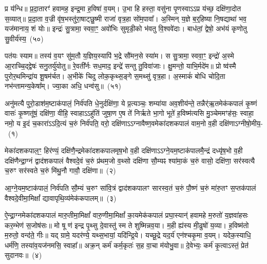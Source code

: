 प्र य॑न्धि॥ प्र॒दा॒तारꣳ॑ हवामह॒ इन्द्र॒मा ह॒विषा॑ व॒यम्। उ॒भा हि हस्ता॒ वसु॑ना पृ॒णस्वा\-ऽ\-ऽप्र य॑च्छ॒ दक्षि॑णा॒दोत स॒व्यात्॥ प्र॒दा॒ता व॒ज्री वृ॑ष॒भस्तु॑रा॒षाट्छु॒ष्मी राजा॑ वृत्र॒हा सो॑म॒पावा᳚। अ॒स्मिन् य॒ज्ञे ब॒र्॒\mbox{}हिष्या नि॒षद्याथा॑ भव॒ यज॑मानाय॒ शं योः॥ इन्द्रः॑ सु॒त्रामा॒ स्ववा॒ꣳ॒ अवो॑भिः सुमृडी॒को भ॑वतु वि॒श्ववे॑दाः। बाध॑तां॒ द्वेषो॒ अभ॑यं कृणोतु सु॒वीर्य॑स्य॒~(५०)

पत॑यः स्याम॥ तस्य॑ व॒यꣳ सु॑म॒तौ य॒ज्ञिय॒स्यापि॑ भ॒द्रे सौ॑मन॒से स्या॑म। स सु॒त्रामा॒ स्ववा॒ꣳ॒ इन्द्रो॑ अ॒स्मे आ॒राच्चि॒द्द्वेषः॑ सनु॒तर्यु॑योतु॥ रे॒वती᳚र्नः सध॒माद॒ इन्द्रे॑ सन्तु तु॒विवा॑जाः। क्षु॒मन्तो॒ याभि॒र्मदे॑म॥ प्रो ष्व॑स्मै पुरोर॒थमिन्द्रा॑य शू॒षम॑र्चत। अ॒भीके॑ चिदु लोक॒कृथ्स॒ङ्गे स॒मथ्सु॑ वृत्र॒हा। अ॒स्माकं॑ बोधि चोदि॒ता नभ॑न्तामन्य॒केषा᳚म्। ज्या॒का अधि॒ धन्व॑सु॥~(५१)

{\anuvakamend[{ज॒रसा॒ मा ते॑ हर्यश्व सु॒वीर्य॒स्याध्येकं॑ च}]}%

\setcounter{anuvakam}{0}
अनु॑मत्यै पुरो॒डाश॑\-म॒ष्टा\-क॑पालं॒ निर्व॑पति धे॒नुर्दक्षि॑णा॒ ये प्र॒त्यञ्चः॒ शम्या॑या अव॒शीय॑न्ते॒ तन्नैर्॑ऋ॒तमेक॑कपालं कृ॒ष्णं वासः॑ कृ॒ष्णतू॑षं॒ दक्षि॑णा॒ वीहि॒ स्वाहा\-ऽ\-ऽहु॑तिं जुषा॒ण ए॒ष ते॑ निर्\mbox{}ऋते भा॒गो भूते॑ ह॒विष्म॑त्यसि मु॒ञ्चेममꣳह॑सः॒ स्वाहा॒ नमो॒ य इ॒दं च॒कारा॑\-ऽ\-ऽदि॒त्यं च॒रुं निर्व॑पति॒ वरो॒ दक्षि॑णा\-ऽ\-ऽग्नावैष्ण॒वमेका॑\-दश\-कपालं वाम॒नो व॒ही दक्षि॑णा\-ऽग्नीषो॒मीय॒-~(१)

मेका॑\-दश\-कपाल॒ꣳ॒ हिर॑ण्यं॒ दक्षि॑णै॒न्द्रमेका॑\-दश\-कपालमृष॒भो व॒ही दक्षि॑णा\-ऽ\-ऽग्ने॒यम॒ष्टाक॑पालमै॒न्द्रं दध्यृ॑ष॒भो व॒ही दक्षि॑णैन्द्रा॒ग्नं द्वाद॑श\-कपालं वैश्वदे॒वं च॒रुं प्र॑थम॒जो व॒थ्सो दक्षि॑णा सौ॒म्यꣴ श्या॑मा॒कं च॒रुं वासो॒ दक्षि॑णा॒ सर॑स्वत्यै च॒रुꣳ सर॑स्वते च॒रुं मि॑थु॒नौ गावौ॒ दक्षि॑णा॥~(२)

{\anuvakamend[{अ॒ग्नी॒षो॒मीयं॒ चतु॑स्त्रिꣳशच्च}]}%

आ॒ग्ने॒यम॒ष्टा\-क॑पालं॒ निर्व॑पति सौ॒म्यं च॒रुꣳ सा॑वि॒त्रं द्वाद॑श\-कपालꣳ सारस्व॒तं च॒रुं पौ॒ष्णं च॒रुं मा॑रु॒तꣳ स॒प्तक॑पालं वैश्वदे॒वीमा॒मिक्षां᳚ द्यावा\-पृथि॒व्य॑मेक॑कपालम्॥~(३)

{\anuvakamend[{आ॒ग्ने॒यम॒ष्टाद॑श}]}%

ऐ॒न्द्रा॒ग्नमेका॑\-दश\-कपालं मारु॒तीमा॒मिक्षां᳚ वारु॒णीमा॒मिक्षां᳚ का॒यमेक॑कपालं प्रघा॒स्यान्॑ हवामहे म॒रुतो॑ य॒ज्ञवा॑हसः कर॒म्भेण॑ स॒जोष॑सः॥ मो षू ण॑ इन्द्र पृ॒थ्सु दे॒वास्तु॑ स्म ते शुष्मिन्नव॒या। म॒ही ह्य॑स्य मी॒ढुषो॑ य॒व्या। ह॒विष्म॑तो म॒रुतो॒ वन्द॑ते॒ गीः॥ यद् ग्रामे॒ यदर॑ण्ये॒ यथ्स॒भायां॒ यदि॑न्द्रि॒ये। यच्छू॒द्रे यद॒र्य॑ एन॑श्चकृ॒मा व॒यम्। यदेक॒स्याधि॒ धर्म॑णि॒ तस्या॑व॒यज॑नमसि॒ स्वाहा᳚॥ अक्र॒न् कर्म॑ कर्म॒कृतः॑ स॒ह वा॒चा म॑योभु॒वा॥ दे॒वेभ्यः॒ कर्म॑ कृ॒त्वा\-ऽस्तं॒ प्रेत॑ सुदानवः॥~(४)

